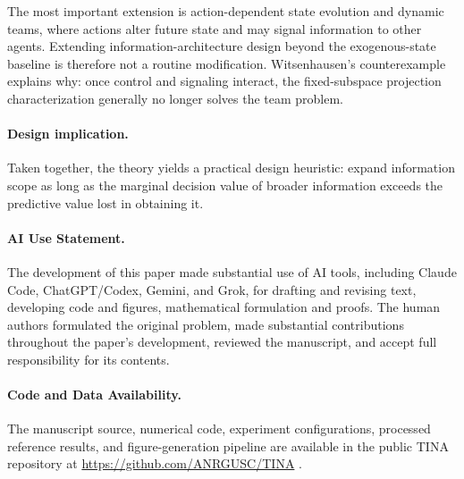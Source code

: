 \documentclass[11pt]{article}
\begin{document}
The most important extension is action-dependent state evolution and dynamic
teams, where actions alter future state and may signal information to other
agents. Extending information-architecture design beyond the exogenous-state
baseline is therefore not a routine modification.
Witsenhausen's counterexample \cite{witsenhausen1968counterexample} explains
why: once control and signaling interact, the fixed-subspace projection
characterization generally no longer solves the team problem.

\paragraph{Design implication.}
Taken together, the theory yields a practical design heuristic: expand
information scope as long as the marginal decision value of broader information
exceeds the predictive value lost in obtaining it.

\paragraph{AI Use Statement.}
The development of this paper made substantial use of AI tools, including
Claude Code, ChatGPT/Codex, Gemini, and Grok, for drafting and revising text,
developing code and figures, mathematical formulation and proofs.
The human authors formulated the original problem, made substantial
contributions throughout the paper's development, reviewed the manuscript, and
accept full responsibility for its contents.

\paragraph{Code and Data Availability.}
The manuscript source, numerical code, experiment configurations, processed
reference results, and figure-generation pipeline are available in the public
TINA repository at \url{https://github.com/ANRGUSC/TINA}
\cite{tina2026software}.



\end{document}
